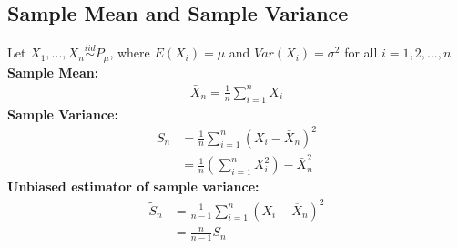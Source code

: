 \subsection{Sample Mean and Sample Variance}
Let $X_1, ..., X_n \stackrel{iid}{\sim} P_{\mu}$, where $E(X_i)=\mu$ and $Var(X_i)=\sigma^2$ for all $i=1,2,...,n$\\
\textbf{Sample Mean:}
\begin{align*}
\bar{X}_n= \frac{1}{n} \sum_{i=1}^{n} X_i
\end{align*}
\textbf{Sample Variance:}
\begin{align*}
S_n &= \frac{1}{n} \sum_{i=1}^{n} (X_i - \bar{X}_n)^2\\ 
&= \frac{1}{n} (\sum_{i=1}^{n} X_i^2) - \bar{X}_n^2
\end{align*}
\textbf{Unbiased estimator of sample variance:}
\begin{align*}
\tilde{S}_n &= \displaystyle  \frac{1}{n-1} \sum _{i=1}^ n \left(X_ i - \overline{X}_ n\right)^2\\
&= \frac{n}{n-1} S_n
\end{align*}
